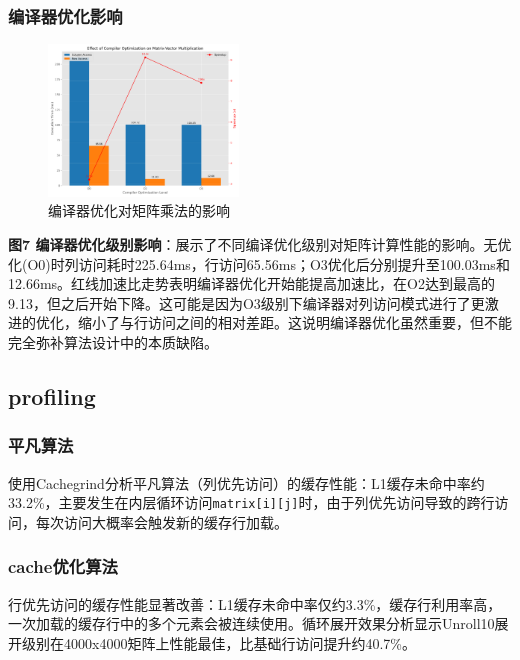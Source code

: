 \documentclass[a4paper,colorlinks=true,linkcolor=blue,urlcolor=blue,citecolor=green,bookmarks=true]{article}
\begin{document}
\subsubsection{编译器优化影响}

\begin{figure}[ht]
  \centering
  \includegraphics[width=0.45\textwidth]{compiler_opt_matrix.png}
  \caption{编译器优化对矩阵乘法的影响}
  \label{fig:compiler_opt_matrix}
\end{figure}

\textbf{图7 编译器优化级别影响}：展示了不同编译优化级别对矩阵计算性能的影响。无优化(O0)时列访问耗时225.64ms，行访问65.56ms；O3优化后分别提升至100.03ms和12.66ms。红线加速比走势表明编译器优化开始能提高加速比，在O2达到最高的9.13，但之后开始下降。这可能是因为O3级别下编译器对列访问模式进行了更激进的优化，缩小了与行访问之间的相对差距。这说明编译器优化虽然重要，但不能完全弥补算法设计中的本质缺陷。

\subsection{profiling}

\subsubsection{平凡算法}

使用Cachegrind分析平凡算法（列优先访问）的缓存性能：L1缓存未命中率约33.2\%，主要发生在内层循环访问\verb|matrix[i][j]|时，由于列优先访问导致的跨行访问，每次访问大概率会触发新的缓存行加载。

\subsubsection{cache优化算法}

行优先访问的缓存性能显著改善：L1缓存未命中率仅约3.3\%，缓存行利用率高，一次加载的缓存行中的多个元素会被连续使用。循环展开效果分析显示Unroll10展开级别在4000x4000矩阵上性能最佳，比基础行访问提升约40.7\%。
\end{document}
